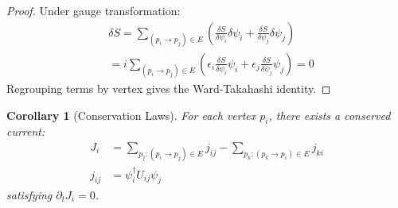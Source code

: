 \documentclass{article}
\newtheorem{corollary}{Corollary}
\begin{document}
\begin{proof}
Under gauge transformation:
\begin{align*}
    &\delta S = \sum_{(p_i \to p_j) \in E} \left(\frac{\delta S}{\delta\psi_i}\delta\psi_i + \frac{\delta S}{\delta\psi_j}\delta\psi_j\right) \\
    &= i\sum_{(p_i \to p_j) \in E} \left(\epsilon_i\frac{\delta S}{\delta\psi_i}\psi_i + \epsilon_j\frac{\delta S}{\delta\psi_j}\psi_j\right) = 0
\end{align*}
Regrouping terms by vertex gives the Ward-Takahashi identity.
\end{proof}

\begin{corollary}[Conservation Laws]
For each vertex $p_i$, there exists a conserved current:
\begin{align*}
    J_i &= \sum_{p_j: (p_i \to p_j) \in E} j_{ij} - \sum_{p_k: (p_k \to p_i) \in E} j_{ki} \\
    j_{ij} &= \psi_i^\dagger U_{ij}\psi_j
\end{align*}
satisfying $\partial_t J_i = 0$.
\end{corollary}
\end{document}
